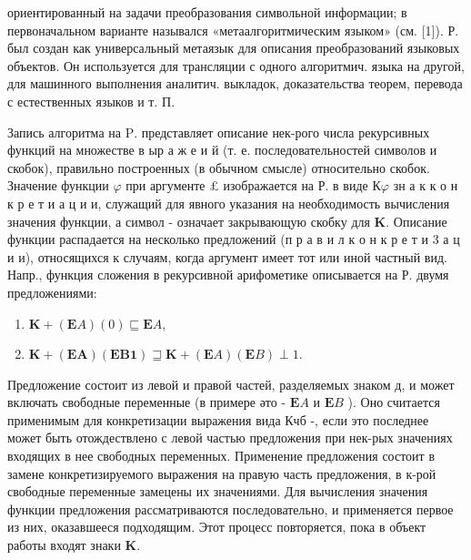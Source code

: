 \documentclass[10pt]{article}
\begin{document}
ориентированный на задачи преобразования символьной информации; в первоначальном варианте назывался «метаалгоритмическим языком» (см. [1]). Р. был создан как универсальный метаязык для описания преобразований языковых объектов. Он используется для трансляции с одного алгоритмич. языка на другой, для машинного выполнения аналитич. выкладок, доказательства теорем, перевода с естественных языков и т. П.



Запись алгоритма на $\mathrm{P}$. представляет описание нек-рого числа рекурсивных функций на множестве в ыр а ж е и й (т. е. последовательностей символов и скобок), правильно построенных (в обычном смысле) относительно скобок. Значение функции $\varphi$ при аргументе £ изображается на Р. в виде $\boldsymbol{К} \varphi$ зн а к к о н к р е т и а ц и и, служащий для явного указания на необходимость вычисления значения функции, а символ - означает закрывающую скобку для $\boldsymbol{K}$. Описание функции распадается на несколько предложений (п р а в и л к о н к р е т и 3 а ц и и), относящихся к случаям, когда аргумент имеет тот или иной частный вид. Напр., функция сложения в рекурсивной арифометике описывается на Р. двумя предложениями:



\begin{enumerate}

  \item $\boldsymbol{K}+(\boldsymbol{E} A)(0) \sqsubseteq \boldsymbol{E} A$,



  \item $\boldsymbol{K}+(\boldsymbol{E A})(\boldsymbol{E B 1}) \sqsupseteq \boldsymbol{K}+(\boldsymbol{E} A)(\boldsymbol{E} B) \perp 1$.



\end{enumerate}



Предложение состоит из левой и правой частей, разделяемых знаком д, и может включать свободные переменные (в примере әто - $\boldsymbol{E} A$ и $\boldsymbol{E} B$ ). Оно считается применимым для конкретизации выражения вида Кчб -, если это последнее может быть отождествлено с левой частью предложения при нек-рых значениях входящих в нее свободных переменных. Применение предложения состоит в замене конкретизируемого выражения на правую часть предложения, в к-рой свободные переменные замецены их значениями. Для вычисления значения функции предложения рассматриваются последовательно, и применяется первое из них, оказавшееся подходящим. Этот процесс повторяется, пока в объект работы входят знаки $\boldsymbol{K}$.
\end{document}
